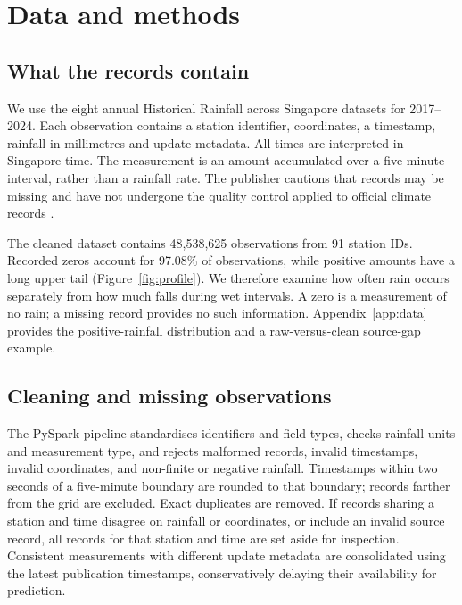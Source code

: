 \section{Data and methods}

\subsection{What the records contain}
We use the eight annual Historical Rainfall across Singapore datasets for 2017--2024. Each observation contains a station identifier, coordinates, a timestamp, rainfall in millimetres and update metadata. All times are interpreted in Singapore time. The measurement is an amount accumulated over a five-minute interval, rather than a rainfall rate. The publisher cautions that records may be missing and have not undergone the quality control applied to official climate records \cite{data}.

The cleaned dataset contains 48,538,625 observations from 91 station IDs. Recorded zeros account for 97.08\% of observations, while positive amounts have a long upper tail (Figure~\ref{fig:profile}). We therefore examine how often rain occurs separately from how much falls during wet intervals. A zero is a measurement of no rain; a missing record provides no such information. Appendix~\ref{app:data} provides the positive-rainfall distribution and a raw-versus-clean source-gap example.


\subsection{Cleaning and missing observations}
The PySpark pipeline standardises identifiers and field types, checks rainfall units and measurement type, and rejects malformed records, invalid timestamps, invalid coordinates, and non-finite or negative rainfall. Timestamps within two seconds of a five-minute boundary are rounded to that boundary; records farther from the grid are excluded. Exact duplicates are removed. If records sharing a station and time disagree on rainfall or coordinates, or include an invalid source record, all records for that station and time are set aside for inspection. Consistent measurements with different update metadata are consolidated using the latest publication timestamps, conservatively delaying their availability for prediction.

